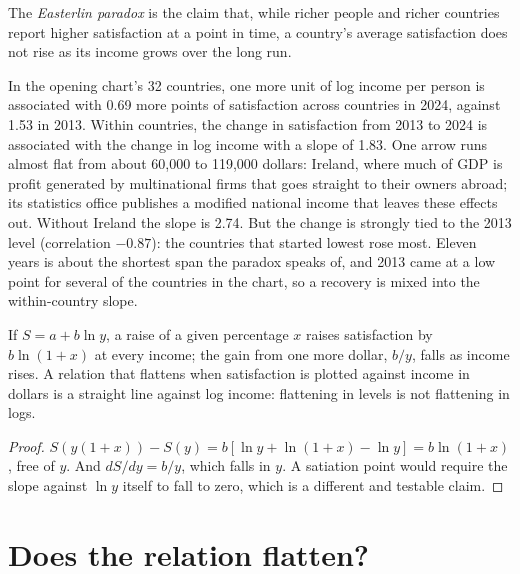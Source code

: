 \begin{definition}\label{def:b3:income-and-wellbeing-evidence:easterlin}
The \emph{Easterlin paradox} is the claim that, while richer people and richer
countries report higher satisfaction at a point in time, a country's average
satisfaction does not rise as its income grows over the long run.
\end{definition}

In the opening chart's 32 countries, one more unit of log income per person is associated with 0.69 more
points of satisfaction across countries in 2024, against 1.53 in 2013. Within countries, the change in satisfaction
from 2013 to 2024 is associated with the change in log income with a slope of 1.83. One
arrow runs almost flat from about 60{,}000 to 119{,}000 dollars: Ireland, where much of GDP is
profit generated by multinational firms that goes straight to their owners abroad;
its statistics office publishes a modified national income that leaves these effects
out. %
Without Ireland the slope is 2.74. But
the change is strongly tied to the 2013 level (correlation $-0.87$): the countries that
started lowest rose most. Eleven years is about the shortest span the paradox speaks
of, and 2013 came at a low point for several of the countries in the chart, so a
recovery is mixed into the within-country slope.

\begin{proposition}\label{prop:b3:income-and-wellbeing-evidence:log-linear}
If $S = a + b\ln y$, a raise of a given percentage $x$ raises satisfaction by $b\ln(1 + x)$ at every income; the
gain from one more dollar, $b/y$, falls as income rises. A relation that flattens when
satisfaction is plotted against income in dollars is a straight line against log
income: flattening in levels is not flattening in logs.
\end{proposition}

\begin{proof}
$S(y(1 + x)) - S(y) = b[\ln y + \ln(1 + x) - \ln y] = b\ln(1 + x)$, free of $y$. And $dS/dy = b/y$, which falls in $y$. A satiation point
would require the slope against $\ln y$ itself to fall to zero, which is a different and
testable claim.
\end{proof}

\section{Does the relation flatten?}\label{sec:b3:income-and-wellbeing-evidence:flatten}

